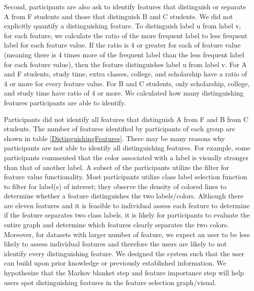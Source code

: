 Second, participants are also ask to identify features that distinguish or separate A from F students and those that distinguish B and C students.  We did not explicitly quantify a distinguishing feature. To distinguish label u from label v, for each feature, we calculate the ratio of the more frequent label to less frequent label for each feature value. If the ratio is 4 or greater for each of feature value (meaning there is 4 times more of the frequent label than the less frequent label for each feature value), then the feature distinguishes label u from label v. For A and F students, study time, extra classes, college, and scholarship have a ratio of 4 or more for every feature value. For B and C students, only scholarship, college, and study time have ratio of 4 or more. We calculated how many distinguishing features participants are able to identify.

Participants did not identify all features that distinguish A from F and B from C students. The number of features identified by participants of each group are shown in table \ref{DistinguishingFeatures}. There may be many reasons why participants are not able to identify all distinguishing features. For example, some participants commented that the color associated with a label is visually stronger than that of another label. A subset of the participants utilize the filter for feature value functionality. Most participants utilize class label selection function to filter for label(s) of interest; they observe the density of colored lines to determine whether a feature distinguishes the two labels/colors. Although there are eleven features and it is feasible to individual assess each feature to determine if the feature separates two class labels, it is likely for participants to evaluate the entire graph and determine which features clearly separates the two colors. Moreover, for datasets with larger number of feature, we expect an user to be less likely to assess individual features and therefore the users are likely to not identify every distinguishing feature. We designed the system such that the user can build upon prior knowledge or previously established information. We hypothesize that the Markov blanket step and feature importance step will help users spot distinguishing features in the feature selection graph/visual.


